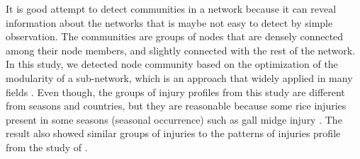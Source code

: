 It is good attempt to detect communities in a network because it can reveal information about the networks that is maybe not easy to detect by simple observation. The communities are groups of nodes that are densely connected among their node members, and slightly connected with the rest of the network.  In this study, we detected node community based on the optimization of the modularity of a sub-network, which is an approach that widely applied in many fields \cite{Liu_2014_Detecting}. Even though, the groups of injury profiles from this study are different from seasons and countries, but they are reasonable because some rice injuries present in some seasons (seasonal occurrence) such as gall midge injury \cite{Krishnaiah_2004_Rice}. The result also showed similar groups of injuries to the patterns of injuries profile from the study of \cite{Savary_2000_Characterization}. 